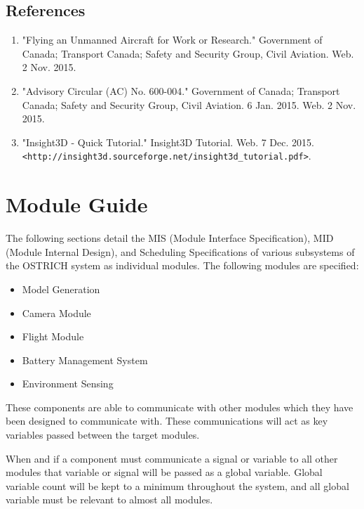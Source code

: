\documentclass[10pt,letterpaper]{article}
\begin{document}
\newpage


\subsection{References}
\begin{enumerate}
	\item "Flying an Unmanned Aircraft for Work or Research." Government of Canada; Transport Canada; Safety and Security Group, Civil Aviation. Web. 2 Nov. 2015.
	\item "Advisory Circular (AC) No. 600-004." Government of Canada; Transport Canada; Safety and Security Group, Civil Aviation. 6 Jan. 2015. Web. 2 Nov. 2015.
    \item "Insight3D - Quick Tutorial." Insight3D Tutorial. Web. 7 Dec. 2015. \texttt{<http://insight3d.sourceforge.net/insight3d\_tutorial.pdf>}.
\end{enumerate}


\newpage


\section{Module Guide}
The following sections detail the MIS (Module Interface Specification), MID (Module Internal Design), and Scheduling Specifications of various subsystems of the OSTRICH system as individual modules. The following modules are specified:

\begin{itemize}
	\item Model Generation
    \item Camera Module
    \item Flight Module
    \item Battery Management System
    \item Environment Sensing
\end{itemize}

These components are able to communicate with other modules which they have been designed to communicate with. These communications will act as key variables passed between the target modules. \par  

When and if a component must communicate a signal or variable to all other modules that variable or signal will be passed as a global variable. Global variable count will be kept to a minimum throughout the system, and all global variable must be relevant to almost all modules. 
\end{document}
